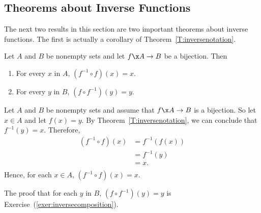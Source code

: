 \subsection*{Theorems about Inverse Functions}
The next two results in this section are two important theorems about inverse functions.  The first is actually a corollary of Theorem~\ref{T:inversenotation}.

\begin{corollary} \label{C:inversecomposition}
Let  $A$  and  $B$  be nonempty sets and let  $f\x A \to B$  be a bijection.  Then
\begin{enumerate}
\item For every $x$ in $A$, $\left( f^{ - 1}  \circ f \right)(x) = x$.
\label{C:inversecomposition1}
\item For every $y$ in $B$, $\left( f \circ f^{ - 1}\right)(y) = y$.
\label{C:inversecomposition2}
\end{enumerate}
\end{corollary}
%
\begin{myproof}
Let  $A$  and  $B$  be nonempty sets and assume that  $f\x A \to B$  is a bijection. 
So let  $x \in A$ and let  $f( x ) = y$.  By Theorem~\ref{T:inversenotation}, we can conclude that  $f^{ - 1} ( y ) = x$.  Therefore,
\[
\begin{aligned}
  \left( {f^{ - 1}  \circ f} \right)( x ) &= f^{ - 1} \! \left( {f( x )} \right) \\ 
                                          &= f^{-1}( y ) \\ 
                                          &= x. \\ 
\end{aligned}
\] 
Hence, for each  $x \in A$, $\left( {f^{ - 1}  \circ f} \right)( x ) = x$.

The proof that for each $y$ in $B$, $\left( f \circ f^{ - 1}\right)(y)  = y$ is 
Exercise~(\ref{exer:inversecomposition}).
\end{myproof}
%
\addtocounter{theorem}{-2}
